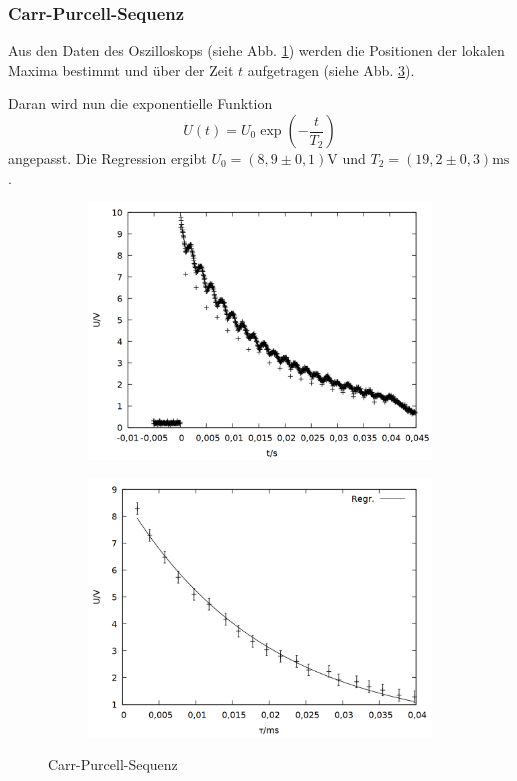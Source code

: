 \subsubsection{Carr-Purcell-Sequenz}
Aus den Daten des Oszilloskops (siehe Abb. \ref{fig:carr_raw}) werden die Positionen der lokalen Maxima bestimmt und über der Zeit $t$ aufgetragen (siehe Abb. \ref{fig:carr}).

Daran wird nun die exponentielle Funktion $$U(t) = U_0\exp{\left(-\frac{t}{T_2}\right)}$$ angepasst. Die Regression ergibt $U_0 = (8,9\pm 0,1)\si{\volt}$ und $T_2 = (19,2\pm 0,3) \si{\milli\second}$.\\

\begin{figure}[h]
  \begin{subfigure}[h]{0.5\textwidth}
    \centering
    \includegraphics[width=\linewidth]{data/p402_443_data/carr_purcell_sequenz/plot_156.png}
    \label{fig:carr_raw}
  \end{subfigure}%
  \begin{subfigure}[h]{0.5\textwidth}
    \centering
    \includegraphics[width=\linewidth]{data/p402_443_data/carr_purcell_sequenz/out_carr.png}
    \label{fig:carr}
  \end{subfigure}
  \caption{Carr-Purcell-Sequenz}
\end{figure}

